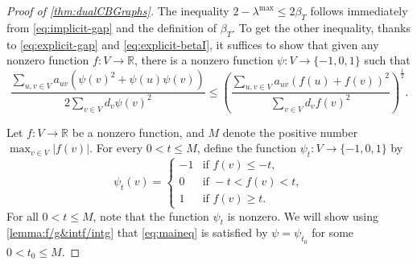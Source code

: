 \documentclass[12pt,a4paper,bold]{thesis}
\theoremstyle{definition}
\newcommand*{\map}[3]{#1 \colon #2 \to #3}
\newcommand*{\abs}[1]{\left\vert #1 \right\vert}
\begin{document}
\begin{proof}[Proof of \cref{thm:dualCBGraphs}]
    The inequality $2 - \lambda^{\max} \leq 2 \beta_T$ follows immediately 
    from \cref{eq:implicit-gap} and the definition of $\beta_T$. To get the other inequality, 
    thanks to \cref{eq:explicit-gap} and \cref{eq:explicit-betaI}, it suffices
    to show that given any nonzero function $\map{f}{V}{\mathbb{R}}$, there is 
    a nonzero function $\map{\psi}{V}{\{-1,0,1\}}$ such that
    \begin{equation} \label{eq:maineq}
        \frac{\sum_{u,v \in V} a_{uv} (\psi(v)^2 + \psi(u)\psi(v))}{2 \sum_{v \in V} d_v \psi(v)^2}
        \leq \left(\frac{\sum_{u,v \in V} a_{uv} (f(u) + f(v))^2}
        {\sum_{v \in V} d_v f(v)^2}\right)^{\frac{1}{2}}.
    \end{equation}

    Let $\map{f}{V}{\mathbb{R}}$ be a nonzero function, and $M$ denote the positive number
    $\max_{v \in V} \abs{f(v)}$. For every $0 < t \leq M$, define the function 
    $\map{\psi_t}{V}{\{-1,0,1\}}$ by
    \begin{equation*}
        \psi_t(v) = 
        \begin{cases}
            -1 & \text{if } f(v) \leq -t,
            \\
            0 & \text{if } -t < f(v) < t,
            \\
            1 & \text{if } f(v) \geq t.
        \end{cases}
    \end{equation*}
    For all $0 < t \leq M$, note that the function $\psi_t$ is nonzero. We will show 
    using \cref{lemma:f/g&intf/intg} that \cref{eq:maineq} is satisfied by 
    $\psi = \psi_{t_0}$ for some $0 < t_0 \leq M$. 
    

\end{proof}
\end{document}
